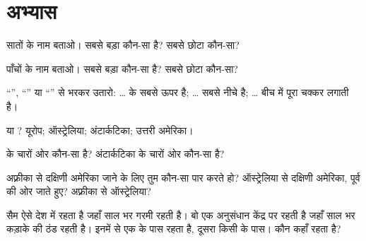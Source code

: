 \section{अभ्यास}

\begin{exercise}[$\star$]\label{exo:g3:continents-and-oceans:1}
सातों  के नाम बताओ। सबसे बड़ा कौन-सा है? सबसे छोटा कौन-सा?
\end{exercise}

\begin{exercise}[$\star$]\label{exo:g3:continents-and-oceans:2}
पाँचों  के नाम बताओ। सबसे बड़ा कौन-सा है? सबसे छोटा कौन-सा?
\end{exercise}

\begin{exercise}[$\star$]\label{exo:g3:continents-and-oceans:3}
``'', ``'' या ``'' से भरकर उतारो:
\dots{}  के सबसे ऊपर है; \dots{} सबसे नीचे है; \dots{} बीच में
पूरा चक्कर लगाती है।
\end{exercise}

\begin{exercise}[$\star$]\label{exo:g3:continents-and-oceans:4}
 या ? यूरोप; ऑस्ट्रेलिया; अंटार्कटिका; उत्तरी
अमेरिका।
\end{exercise}

\begin{exercise}[$\star$]\label{exo:g3:continents-and-oceans:5}
 के चारों ओर कौन-सा  है? अंटार्कटिका के चारों ओर कौन-सा
 है?
\end{exercise}

\begin{exercise}[$\star\star$]\label{exo:g3:continents-and-oceans:6}
अफ़्रीका से दक्षिणी अमेरिका जाने के लिए तुम कौन-सा  पार करते हो?
ऑस्ट्रेलिया से दक्षिणी अमेरिका, पूर्व की ओर जाते हुए? अफ़्रीका से ऑस्ट्रेलिया?
\end{exercise}

\begin{exercise}[$\star\star$]\label{exo:g3:continents-and-oceans:7}
सैम ऐसे देश में रहता है जहाँ साल भर गरमी रहती है। बो एक अनुसंधान केंद्र पर
रहती है जहाँ साल भर कड़ाके की ठंड रहती है। इनमें से एक  के पास
रहता है, दूसरा किसी  के पास। कौन कहाँ रहता है?
\end{exercise}

